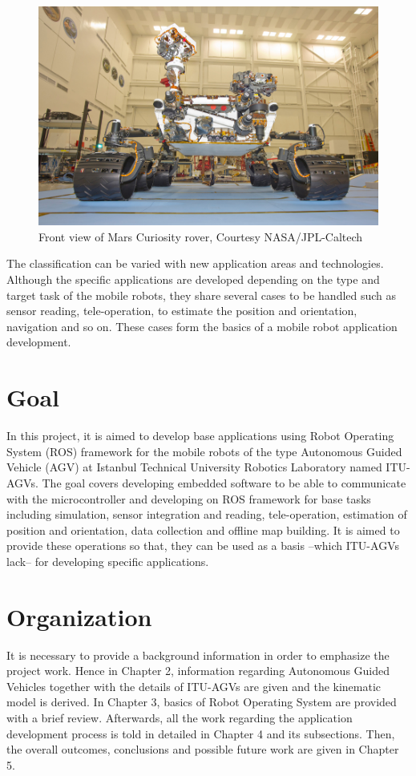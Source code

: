 \begin{figure}
	\centering
	\includegraphics[scale=1.4]{images/img1-mars-rover}
	\caption{Front view of Mars Curiosity rover, Courtesy NASA/JPL-Caltech \cite{curiosity}}
	\label{fig:curiosity}
\end{figure}

The classification can be varied with new application areas and technologies. Although the specific applications are developed depending on the type and target task of the mobile robots, they share several cases to be handled such as sensor reading, tele-operation, to estimate the position and orientation, navigation and so on. These cases form the basics of a mobile robot application development. 

\section{Goal}
\label{sec:goal}
In this project, it is aimed to develop base applications using Robot Operating System (ROS) framework for the mobile robots of the type Autonomous Guided Vehicle (AGV) at Istanbul Technical University Robotics Laboratory named ITU-AGVs. The goal covers developing embedded software to be able to communicate with the microcontroller and developing on ROS framework for base tasks including simulation, sensor integration and reading, tele-operation, estimation of position and orientation, data collection and offline map building. It is aimed to provide these operations so that, they can be used as a basis –which ITU-AGVs lack– for developing specific applications. 


\section{Organization}
\label{sec:organization}
It is necessary to provide a background information in order to emphasize the project work. Hence in Chapter 2, information regarding Autonomous Guided Vehicles together with the details of ITU-AGVs are given and the kinematic model is derived. In Chapter 3, basics of Robot Operating System are provided with a brief review. Afterwards, all the work regarding the application development process is told in detailed in Chapter 4 and its subsections. Then, the overall outcomes, conclusions and possible future work are given in Chapter 5. 